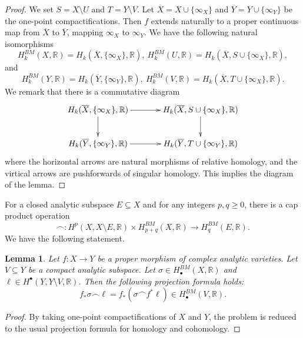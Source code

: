 \documentclass[12pt]{amsart}
\newcommand{\<}{\leq}
\def\>{\geq}
\newtheorem{lemma}[theorem]{Lemma}
\theoremstyle{remark}
\theoremstyle{definition}
\theoremstyle{definition}
\numberwithin{equation}{section}
\theoremstyle{definition}
\theoremstyle{definition}
\begin{document}
\begin{proof}
We set $S=X\setminus U$ and $T = Y\setminus V$. 
Let $\overline{X} = X \cup \{ \infty_X\}$ and   $\overline{Y} = Y \cup \{ \infty_Y\}$  be the one-point compactifications.    
Then $f$ extends naturally to a proper continuous map from $\overline{X}$ to $\overline{Y}$, mapping $\infty_X$ to $\infty_Y$.
We have the following natural isomorphisms 
\[
H^{BM}_k(X,\mathbb{R}) = H_k(\overline{X}, \{\infty_X\},\mathbb{R}), \ H^{BM}_k(U,\mathbb{R}) = H_k(\overline{X}, S \cup \{\infty_X\},\mathbb{R}),
\]
and 
\[
H^{BM}_k(Y,\mathbb{R}) = H_k(\overline{Y}, \{\infty_Y\},\mathbb{R}), \ H^{BM}_k(V,\mathbb{R}) = H_k(\overline{X}, T \cup \{\infty_X\},\mathbb{R}).
\]
We remark that there is a commutative diagram 
\begin{equation*}
  \xymatrixcolsep{3pc}
  \xymatrix{ 
   H_k(\overline{X}, \{\infty_X\},\mathbb{R}) \ar[r] \ar[d] & H_k(\overline{X}, S \cup \{\infty_X\},\mathbb{R}) \ar[d]\\
  H_k(\overline{Y}, \{\infty_Y\},\mathbb{R}) \ar[r] &  H_k(\overline{Y}, T \cup \{\infty_Y\},\mathbb{R})
  }
\end{equation*}
where the horizontal arrows are natural morphisms of relative homology, and the virtical arrows are pushforwards of singular homology. 
This implies the diagram of the lemma.
\end{proof}

For a closed analytic subspace $E\subseteq X$ and for any integers $p,q \> 0$, there is a cap product operation
\[
\smallfrown\colon  H^{p}(X,X\setminus E, \mathbb{R}) \times H^{BM}_{p+q}(X, \mathbb{R}) \to H^{BM}_q(E, \mathbb{R}). 
\]
We have the following statement. 

\begin{lemma}
\label{lemma:BM-projection-formula}
Let $f\colon X\to Y$ be a proper morphism of complex analytic varieties. 
Let $ V\subseteq Y$ be a compact analytic subspace.  
Let $\sigma \in H^{BM}_{\bullet}(X, \mathbb{R})$ and 
$\ell \in H^{\bullet}(Y, Y\setminus V, \mathbb{R})$. 
Then the following projection formula holds:
\[
f_*\sigma \smallfrown \ell = f_*(\sigma \smallfrown f^*\ell) \in H^{BM}_{\bullet}(V, \mathbb{R}).
\]
\end{lemma}

\begin{proof}
By taking one-point compactifications of $X$ and $Y$, the problem is reduced to the usual projection formula for homology and cohomology.
\end{proof}
\end{document}
